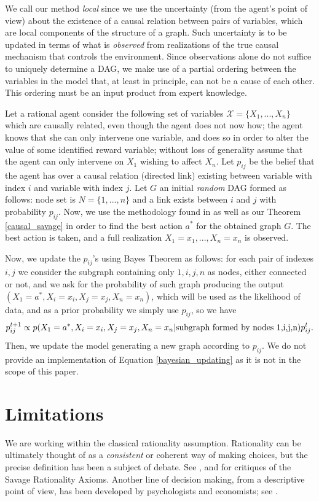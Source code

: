 \documentclass[review]{elsarticle}
\begin{document}
We call our method \textit{local} since we use the uncertainty (from the agent's point of view) about the existence of a causal relation between pairs of variables, which are local components of the structure of a graph. Such uncertainty is to be updated in terms of what is \textit{observed} from realizations of the true causal mechanism that controls the environment. Since observations alone do not suffice to uniquely determine a DAG, we make use of a partial ordering between the variables in the model that, at least in principle, can not be a cause of each other. This ordering must be an input product from expert knowledge.

Let a rational agent consider the following set of variables $\mathcal{X}=\{ X_1,...,X_n \}$ which are causally related, even though the agent does not now how; the agent knows that she can only intervene one variable, and does so in order to alter the value of some  identified reward variable; without loss of generality assume that the agent can only intervene on $X_1$ wishing to affect $X_n$. Let $p_{ij}$ be the belief that the agent has over a causal relation (directed link) existing between variable with index $i$ and variable with index $j$. Let $G$ an initial {\em random} DAG formed as follows: node set is $N=\{1,...,n\}$ and a link exists between $i$ and $j$ with probability $p_{ij}$. Now, we use the methodology found in \cite{gonzalez2018playing}  as well as our Theorem \ref{causal_savage} in order to find the best action $a^\ast$ for the obtained graph $G$. The best action is taken, and a full realization $X_1=x_1,...,X_n=x_n$ is observed.

Now, we update the $p_{ij}$'s using Bayes Theorem as follows: for each pair of indexes $i,j$ we consider the subgraph containing only $1,i,j,n$ as nodes, either connected or not, and we ask for the probability of such graph producing the output $(X_1 = a^\ast, X_i = x_i, X_j=x_j, X_n=x_n)$, which will be used as the likelihood of data, and as a prior probability we simply use $p_{ij}$, so we have
\begin{equation}{\label{bayesian_updating}}
p_{ij}^{t+1} \propto p(X_1 = a^\ast, X_i = x_i, X_j=x_j, X_n=x_n | \textrm{subgraph formed by nodes 1,i,j,n})p_{ij}^t.
\end{equation}
Then, we update the model generating a new graph according to $p_{ij}$. We do not provide an implementation of Equation \ref{bayesian_updating} as it is not in the scope of this paper.

\section{Limitations}
\label{limitations}
We are working within the classical rationality assumption. Rationality can be ultimately thought of as a \textit{consistent} or coherent way of making choices, but the precise definition has been a subject of debate. See \cite{ellsberg1961risk}, \cite{gilboa2009decision} and \cite{machina2014ambiguity} for critiques of the Savage Rationality Axioms. Another line of decision making, from a descriptive point of view, has been developed by psychologists and economists; see \cite{TverskyKahneman74,kahneman1979prospect,kahneman2000choices}.
\end{document}
